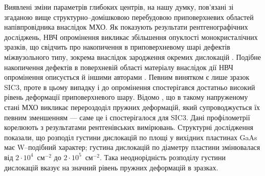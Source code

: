 Виявлені зміни параметрів глибоких центрів, на нашу думку, пов'язані зі згаданою вище структурно--домішковою перебудовою приповерхневих областей напівпровідника внаслідок МХО.
Як показують результати рентгенографічних досліджень, НВЧ опромінення викликає збільшення опуклості монокристалічних зразків, що свідчить про накопичення в приповерхневому шарі дефектів міжвузольного типу,
зокрема внаслідок зародження окремих дислокацій  \cite{Boltovets,Konakova2012FTP}.
Подібне накопичення дефектів в поверхневій області матеріалу внаслідок дії НВЧ опромінення описується й іншими авторами \cite{Boltovets,Belyaev1998JTFr,Konakova2015}.
Певним винятком є лише зразок SIC3, проте в цьому випадку і до опромінення спостерігався достатньо високий рівень
деформації приповерхневого шару.
Відомо \cite{Bacherikov2003r,Pashkov1994r,Boltovets,Kr1996,Milenin1994,BelyaevIntac}, що в такому напруженому стані МХО викликає перероздоділ пружних деформацій, який супроводжується їх певним зменшенням --- саме це і спостерігалося для SIC3.
Дані профілометрії корелюють з результатами рентгенівських вимірювань.
Структурні дослідження показали, що розподіл густини дислокацій по площі у вихідних пластинах GaAs має W--подібний характер;
густина дислокацій по діаметру пластини змінювалася від $2\cdot10^{4}$~см$^{-2}$ до $2\cdot10^{5}$~см$^{-2}$.
Така неоднорідність розподілу густини дислокацій вказує на значний рівень пружних деформацій в зразках.


